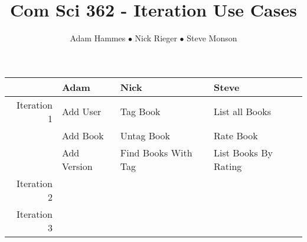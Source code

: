 \documentclass[a4paper]{article}
\title{Com Sci 362 - Iteration Use Cases}
\author{Adam Hammes $\bullet$ Nick Rieger $\bullet$ Steve Monson}
\begin{document}
\maketitle

\begin{tabular}{| r | l | l | l |}
  \hline             & Adam        & Nick                & Steve                \\ 
  \hline Iteration 1 & Add User    & Tag Book            & List all Books       \\ 
                     & Add Book    & Untag Book          & Rate Book            \\ 
                     & Add Version & Find Books With Tag & List Books By Rating \\
  \hline Iteration 2 & & & \\
  \hline Iteration 3 & & & \\
  \hline
\end{tabular}
\end{document}
